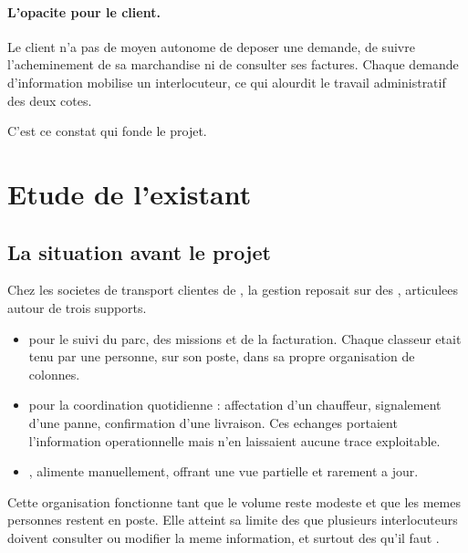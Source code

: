 \paragraph{L'opacite pour le client.}
Le client n'a pas de moyen autonome de deposer une demande, de suivre
l'acheminement de sa marchandise ni de consulter ses factures. Chaque
demande d'information mobilise un interlocuteur, ce qui alourdit le
travail administratif des deux cotes.

\vspace{0.4cm}
\noindent
{} C'est ce constat qui fonde le projet.

\section{Etude de l'existant}
\label{sec:existant}

\subsection{La situation avant le projet}

Chez les societes de transport clientes de \entreprise, la gestion
reposait sur des , articulees autour
de trois supports.

\begin{itemize}
  \item {} pour le suivi du parc,
    des missions et de la facturation. Chaque classeur etait tenu par une
    personne, sur son poste, dans sa propre organisation de colonnes.
  \item {}
    pour la coordination quotidienne : affectation d'un chauffeur,
    signalement d'une panne, confirmation d'une livraison. Ces echanges
    portaient l'information operationnelle mais n'en laissaient aucune
    trace exploitable.
  \item {}, alimente
    manuellement, offrant une vue partielle et rarement a jour.
\end{itemize}

Cette organisation fonctionne tant que le volume reste modeste et que les
memes personnes restent en poste. Elle atteint sa limite des que
plusieurs interlocuteurs doivent consulter ou modifier la meme
information, et surtout des qu'il faut .

